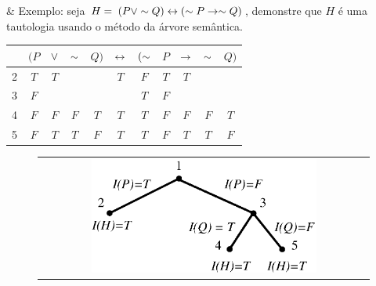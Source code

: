 \clearpage

\begin{easylist}
  & Exemplo: seja $H = \; (P \lor \sim Q) \leftrightarrow (\sim P \rightarrow \sim Q)$, demonstre que $H$ é uma tautologia usando o método da árvore semântica.
\end{easylist}

\begin{center}
  \begin{tabular}{ c|cccccccccc }
        & $(P$ & $\lor$ & $\sim$ & $Q)$ & $\leftrightarrow$ & $(\sim$ & $P$ & $\rightarrow$ & $\sim$ & $Q)$ \\
    \hline
      2 & $T$  & $T$   &        &      & $T$    & $F$     & $T$ & $T$    &        &      \\
    \hline
      3 & $F$  &       &        &      &        & $T$     & $F$ &        &        &      \\
    \hline
      4 & $F$  & $F$   & $F$    & $T$  & $T$    & $T$     & $F$ & $F$    & $F$    & $T$  \\
    \hline
      5 & $F$  & $T$   & $T$    & $F$  & $T$    & $T$     & $F$ & $T$    & $T$    & $F$  \\
  \end{tabular}
\end{center}

\begin{figure}[!h]
  \begin{center}
    \begin{tabular}{c}
      \includegraphics[width=0.7\textwidth]{images/04/tree_02.eps}
    \end{tabular}
  \end{center}
\end{figure}


